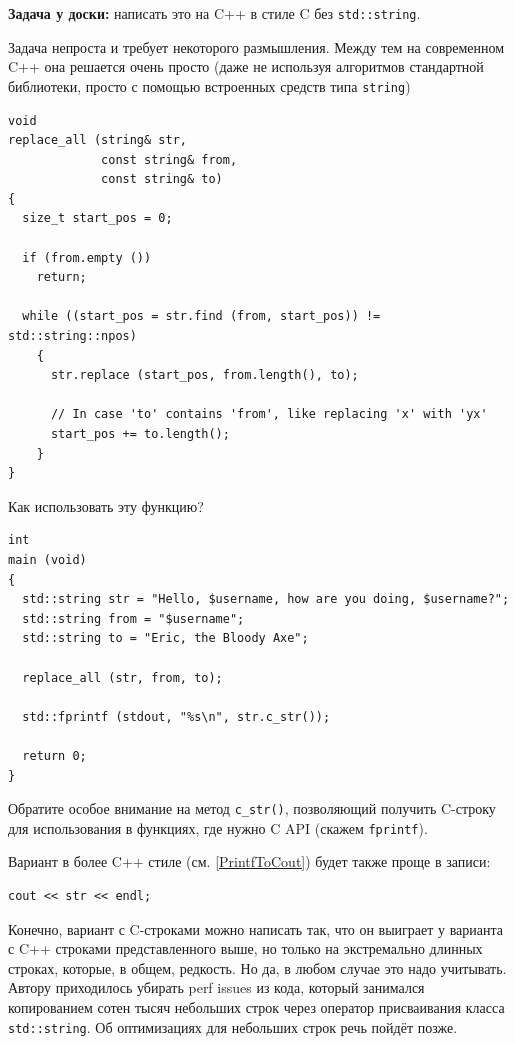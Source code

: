 \documentclass[a4paper,12pt,oneside]{article}
\begin{document}
\textbf{Задача у доски:} написать это на C++ в стиле C без \lstinline!std::string!.

Задача непроста и требует некоторого размышления. Между тем на современном C++ она решается очень просто (даже не используя алгоритмов стандартной библиотеки, просто с помощью встроенных средств типа \lstinline!string!)

\begin{lstlisting}
void
replace_all (string& str,
             const string& from,
             const string& to)
{
  size_t start_pos = 0;

  if (from.empty ())
    return;

  while ((start_pos = str.find (from, start_pos)) != std::string::npos)
    {
      str.replace (start_pos, from.length(), to);

      // In case 'to' contains 'from', like replacing 'x' with 'yx'
      start_pos += to.length(); 
    }
}
\end{lstlisting}

Как использовать эту функцию?

\begin{lstlisting}
int
main (void)
{
  std::string str = "Hello, $username, how are you doing, $username?";
  std::string from = "$username";
  std::string to = "Eric, the Bloody Axe";

  replace_all (str, from, to);

  std::fprintf (stdout, "%s\n", str.c_str());

  return 0;
}
\end{lstlisting}

Обратите особое внимание на метод \lstinline!c_str()!, позволяющий получить C-строку для использования в функциях, где нужно C API (скажем \lstinline!fprintf!).

Вариант в более C++ стиле (см. \ref{PrintfToCout}) будет также проще в записи:

\begin{lstlisting}
cout << str << endl;
\end{lstlisting}

Конечно, вариант с C-строками можно написать так, что он выиграет у варианта с C++ строками представленного выше, но только на экстремально длинных строках, которые, в общем, редкость. Но да, в любом случае это надо учитывать. Автору приходилось убирать perf issues из кода, который занимался копированием сотен тысяч небольших строк через оператор присваивания класса \lstinline!std::string!. Об оптимизациях для небольших строк речь пойдёт позже. 
\end{document}

